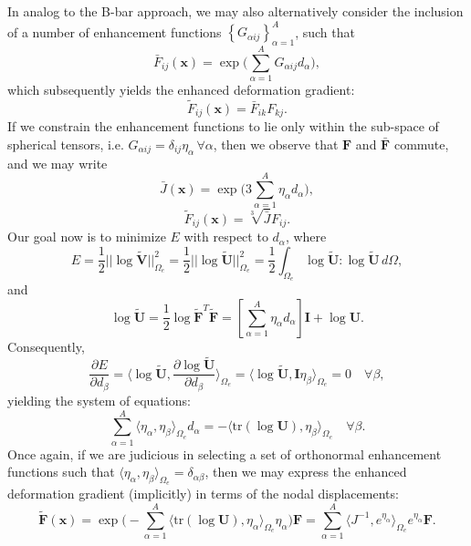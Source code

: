 \documentclass[12pt]{book}
\begin{document}
In analog to the B-bar approach, we may also alternatively consider the inclusion of a number of enhancement functions $\left\{ G_{\alpha ij} \right\}_{\alpha = 1}^A$, such that
\begin{equation}
  \bar{F}_{ij} (\mathbf{x}) = \exp \bigg( \sum_{\alpha = 1}^A G_{\alpha ij} d_{\alpha} \bigg),
\end{equation}
which subsequently yields the enhanced deformation gradient:
\begin{equation}
  \tilde{F}_{ij} (\mathbf{x}) = \bar{F}_{ik} F_{kj}.
\end{equation}
If we constrain the enhancement functions to lie only within the sub-space of spherical tensors, i.e. $G_{\alpha ij} = \delta_{ij} \eta_{\alpha} \, \forall \alpha$, then we observe that $\mathbf{F}$ and $\bar{\mathbf{F}}$ commute, and we may write
\begin{equation}
  \bar{J} (\mathbf{x}) = \exp \bigg( 3 \sum_{\alpha = 1}^A \eta_{\alpha} d_{\alpha} \bigg),
\end{equation}
\begin{equation}
  \tilde{F}_{ij} (\mathbf{x}) = \sqrt[3]{\bar{J}} F_{ij}.
\end{equation}
Our goal now is to minimize $E$ with respect to $d_\alpha$, where
\begin{equation}
  E = \frac{1}{2} || \log \tilde{\mathbf{V}} ||^2_{\Omega_e} = \frac{1}{2} || \log \tilde{\mathbf{U}} ||^2_{\Omega_e} = \frac{1}{2} \int_{\Omega_e} \log \tilde{\mathbf{U}} \colon \log \tilde{\mathbf{U}} \, d \Omega,
\end{equation}
and
\begin{equation}
  \log \tilde{\mathbf{U}} = \frac{1}{2} \log \tilde{\mathbf{F}}^T \tilde{\mathbf{F}} = \left[ \sum_{\alpha = 1}^A \eta_{\alpha} d_{\alpha} \right] \mathbf{I} + \log \mathbf{U}.
\end{equation}
Consequently,
\begin{equation}
  \frac{\partial E}{\partial d_{\beta}} = \langle \log \tilde{\mathbf{U}}, \frac{\partial \log \tilde{\mathbf{U}}}{\partial d_{\beta}} \rangle_{\Omega_e} = \langle \log \tilde{\mathbf{U}}, \mathbf{I} \eta_{\beta} \rangle_{\Omega_e} = 0 \quad \forall \beta,
\end{equation}
yielding the system of equations:
\begin{equation}
  \sum_{\alpha=1}^A \langle \eta_{\alpha}, \eta_{\beta} \rangle_{\Omega_e} d_{\alpha} = - \langle \text{tr} (\log \mathbf{U}), \eta_{\beta} \rangle_{\Omega_e} \quad \forall \beta.
\end{equation}
Once again, if we are judicious in selecting a set of orthonormal enhancement functions such that $\langle \eta_{\alpha}, \eta_{\beta} \rangle_{\Omega_e} = \delta_{\alpha \beta}$, then we may express the enhanced deformation gradient (implicitly) in terms of the nodal displacements:
\begin{equation}
  \tilde{\mathbf{F}} (\mathbf{x}) = \exp \bigg( - \sum_{\alpha = 1}^A \langle \text{tr} (\log \mathbf{U}), \eta_{\alpha} \rangle_{\Omega_e} \eta_{\alpha} \bigg) \mathbf{F} = \sum_{\alpha = 1}^A \langle J^{-1}, e^{\eta_{\alpha}} \rangle_{\Omega_e} e^{\eta_{\alpha}} \mathbf{F}.
\end{equation}
\end{document}
